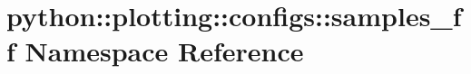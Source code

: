 \hypertarget{namespacepython_1_1plotting_1_1configs_1_1samples__ff}{
\section{python::plotting::configs::samples\_\-ff Namespace Reference}
\label{namespacepython_1_1plotting_1_1configs_1_1samples__ff}
}
